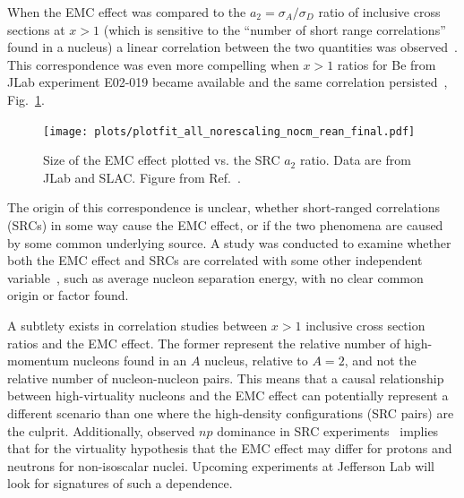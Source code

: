 When the EMC effect was compared to the $a_2=\sigma_A/\sigma_D$ ratio of
inclusive cross sections at $x>1$ (which is sensitive to the ``number of short range correlations''
found in a nucleus) a linear correlation between the two quantities was observed~\cite{Weinstein:2010rt}.
This correspondence was even more compelling when $x>1$ ratios for Be from JLab experiment E02-019 became
available and the same correlation persisted~\cite{Arrington:2012ax, Hen:2012fm}, Fig.~\ref{fig:emc_src_bff}.

\begin{figure}[tbp]
  \centering\texttt{[image: plots/plotfit\_all\_norescaling\_nocm\_rean\_final.pdf]}
  \caption{Size of the EMC effect plotted vs. the SRC $a_2$ ratio. Data are from JLab and SLAC. Figure
  from Ref.~\cite{Arrington:2012ax}.}
  \label{fig:emc_src_bff}
\end{figure}

The origin of this correspondence is unclear, whether short-ranged correlations (SRCs) in some way cause the EMC effect, or if the two
phenomena are caused by some common underlying source.  A study was conducted to examine whether
both the EMC effect and SRCs are correlated with some other independent variable~\cite{Arrington:2012ax}, such
as average nucleon separation energy, with no clear common origin or factor found.

A subtlety exists in correlation studies between $x>1$ inclusive cross section ratios and the EMC effect.  The former represent the relative number of high-momentum nucleons found in an $A$ nucleus, relative to $A=2$, and not the relative number of nucleon-nucleon pairs.  This means that a causal relationship between high-virtuality nucleons and the EMC effect can potentially represent a different scenario than one where the high-density configurations (SRC pairs) are the culprit.  Additionally, observed $np$ dominance in SRC experiments~\cite{Subedi:2008zz} implies that for the virtuality hypothesis that the EMC effect may differ for protons and neutrons for non-isoscalar nuclei.  Upcoming experiments at Jefferson Lab will look for signatures of such a dependence. 

